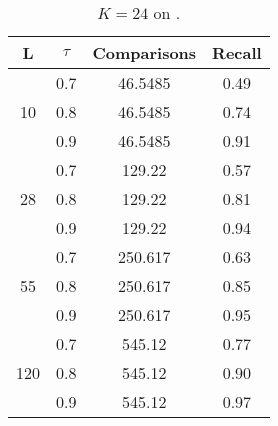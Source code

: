 \documentclass[11pt]{article}
\begin{document}
\begin{table}
\centering
\begin{tabular}{|c|c|c|c|}
\hline
L & $\tau$ & Comparisons & Recall \\ 
\hline
\multirow{3}{*}{10} & 0.7 & 46.5485 & 0.49 \\
  & 0.8 & 46.5485 & 0.74 \\
 & 0.9 & 46.5485 & 0.91 \\
\hline
\multirow{3}{*}{28} & 0.7 & 129.22 & 0.57 \\
 & 0.8 & 129.22 & 0.81 \\
 & 0.9 & 129.22 & 0.94 \\
\hline
\multirow{3}{*}{55} & 0.7 & 250.617 & 0.63 \\
 & 0.8 & 250.617 & 0.85 \\
 & 0.9 & 250.617 & 0.95 \\
\hline
\multirow{3}{*}{120} & 0.7 & 545.12 & 0.77 \\
 & 0.8 & 545.12 & 0.90 \\
 & 0.9 & 545.12 & 0.97 \\
\hline 
 \end{tabular}
\caption{\footnotesize{$K=24$ on \dataB.}}
\label{tab:data-so}
\end{table}



\end{document}
